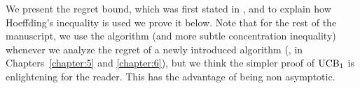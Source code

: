 We present the regret bound, which was first stated in \cite{Auer02}, and to explain how Hoeffding's inequality is used we prove it below.
Note that for the rest of the manuscript, we use the \klUCB{} algorithm (and more subtle concentration inequality) whenever we analyze the regret of a newly introduced algorithm (\ie, in Chapters~\ref{chapter:5} and \ref{chapter:6}),
but we think the simpler proof of $\mathrm{UCB}_1$ is enlightening for the reader.
%
This has the advantage of being non asymptotic.

